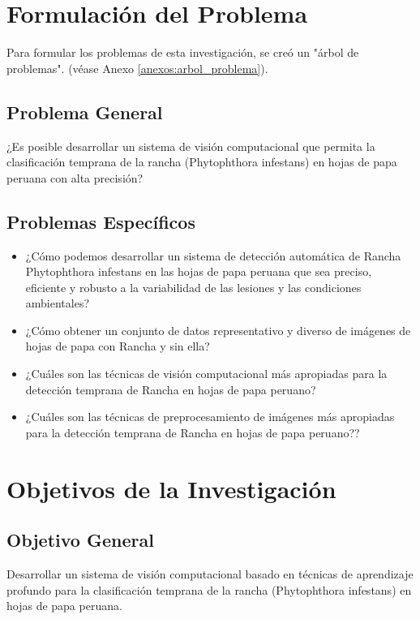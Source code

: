 \section{Formulación del Problema}
Para formular los problemas de esta investigación, se creó un "árbol de problemas". (véase Anexo \ref{anexos:arbol_problema}).
\subsection{Problema General}
\newcommand{\ProblemaGeneral}{
	¿Es posible desarrollar un sistema de visión computacional que permita la clasificación temprana de la rancha (Phytophthora infestans) en hojas de papa peruana con alta precisión?
}
\ProblemaGeneral
\subsection{Problemas Espec\'{i}ficos}
\newcommand{\Pbone}{
	¿Cómo podemos desarrollar un sistema de detección automática de Rancha Phytophthora infestans en las hojas de papa peruana que sea preciso, eficiente y robusto a la variabilidad de las lesiones y las condiciones ambientales?
}
\newcommand{\Pbtwo}{
	¿Cómo obtener un conjunto de datos representativo y diverso de imágenes de hojas de papa con Rancha y sin ella?
}
\newcommand{\Pbthree}{
	¿Cuáles son las técnicas de visión computacional más apropiadas para la detección temprana de Rancha en hojas de papa peruano?
}
\newcommand{\Pbfour}{
	¿Cuáles son las técnicas de preprocesamiento de imágenes más apropiadas para la detección temprana de Rancha en hojas de papa peruano??
}

\begin{itemize}
	\item \Pbone
	\item \Pbtwo
	\item \Pbthree
	\item \Pbfour
\end{itemize}

\section{Objetivos de la Investigación} 
\subsection{Objetivo General}
\newcommand{\ObjetivoGeneral}{
	Desarrollar un sistema de visión computacional basado en técnicas de aprendizaje profundo para la clasificación temprana de la rancha (Phytophthora infestans) en hojas de papa peruana.
}
\ObjetivoGeneral
